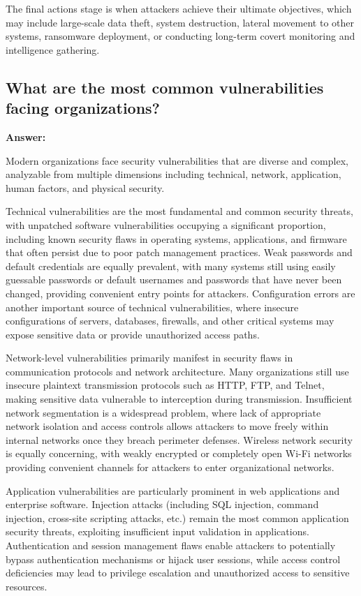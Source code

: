 \documentclass[12pt,a4paper]{article}
\begin{document}
The final actions stage is when attackers achieve their ultimate objectives, which may include large-scale data theft, system destruction, lateral movement to other systems, ransomware deployment, or conducting long-term covert monitoring and intelligence gathering.

\subsection{What are the most common vulnerabilities facing organizations?}

\textbf{Answer:}

Modern organizations face security vulnerabilities that are diverse and complex, analyzable from multiple dimensions including technical, network, application, human factors, and physical security.

Technical vulnerabilities are the most fundamental and common security threats, with unpatched software vulnerabilities occupying a significant proportion, including known security flaws in operating systems, applications, and firmware that often persist due to poor patch management practices. Weak passwords and default credentials are equally prevalent, with many systems still using easily guessable passwords or default usernames and passwords that have never been changed, providing convenient entry points for attackers. Configuration errors are another important source of technical vulnerabilities, where insecure configurations of servers, databases, firewalls, and other critical systems may expose sensitive data or provide unauthorized access paths.

Network-level vulnerabilities primarily manifest in security flaws in communication protocols and network architecture. Many organizations still use insecure plaintext transmission protocols such as HTTP, FTP, and Telnet, making sensitive data vulnerable to interception during transmission. Insufficient network segmentation is a widespread problem, where lack of appropriate network isolation and access controls allows attackers to move freely within internal networks once they breach perimeter defenses. Wireless network security is equally concerning, with weakly encrypted or completely open Wi-Fi networks providing convenient channels for attackers to enter organizational networks.

Application vulnerabilities are particularly prominent in web applications and enterprise software. Injection attacks (including SQL injection, command injection, cross-site scripting attacks, etc.) remain the most common application security threats, exploiting insufficient input validation in applications. Authentication and session management flaws enable attackers to potentially bypass authentication mechanisms or hijack user sessions, while access control deficiencies may lead to privilege escalation and unauthorized access to sensitive resources.
\end{document}
